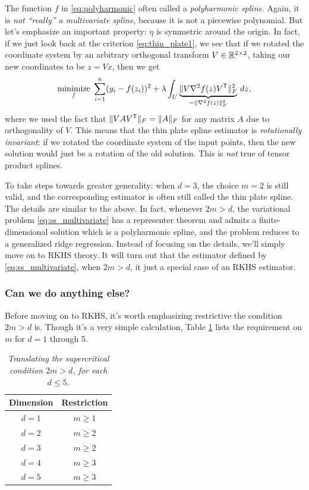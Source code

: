 \documentclass{article}
\begin{document}
The function $f$ in \eqref{eq:polyharmonic} often called a \emph{polyharmonic
  spline}. Again, it is \emph{not ``really'' a multivariate spline}, because it
is not a piecewise polynomial. But let's emphasize an important property: $\eta$
is symmetric around the origin. In fact, if we just look back at the criterion
\eqref{eq:thin_plate1}, we see that if we rotated the coordinate system by an
arbitrary orthogonal transform $V \in \mathbb{R}^{2 \times 2}$, taking our new
coordinates to be $z=Vx$, then we get 
\[
\mathop{\mathrm{minimize}}_f \; \sum_{i=1}^n (y_i - f(z_i))^2 + \lambda \int_U \underbrace{
\| V \nabla^2 f(z) V^{\mathsf{T}}\|_F^2}_{= \|\nabla^2 f(z)\|_F^2} \, dz,  
\]
where we used the fact that $\|V A V^{\mathsf{T}}\|_F = \|A\|_F$ for any matrix $A$ due to
orthogonality of $V$. This means that the thin plate spline estimator is
\emph{rotationally invariant}: if we rotated the coordinate system of the input
points, then the new solution would just be a rotation of the old solution. This
is \emph{not} true of tensor product splines. 

To take steps towards greater generality: when $d=3$, the choice $m=2$ is still
valid, and the corresponding estimator is often still called the thin plate
spline. The details are similar to the above. In fact, whenever $2m > d$, the
variational problem \eqref{eq:ss_multivariate} has a representer theorem and
admits a finite-dimensional solution which is a polyharmonic spline, and the
problem reduces to a generalized ridge regression. Instead of focusing on the
details, we'll simply move on to RKHS theory. It will turn out that the
estimator defined by \eqref{eq:ss_multivariate}, when $2m > d$, it just a
special case of an RKHS estimator.

\subsubsection{Can we do anything else?}

Before moving on to RKHS, it's worth emphasizing restrictive the condition  
$2m > d$ is. Though it's a very simple calculation, Table
\ref{tab:supercritical} lists the requirement on $m$ for $d=1$ through 5.  

\begin{table}[htb]
\centering
\begin{tabular}{c|c}
Dimension & Restriction \\
\hline
$d=1$ & $m \geq 1$ \\
$d=2$ & $m \geq 2$ \\
$d=3$ & $m \geq 2$ \\
$d=4$ & $m \geq 3$ \\
$d=5$ & $m \geq 3$ 
\end{tabular}
\caption{\it Translating the supercritical condition $2m > d$, for each $d 
  \leq 5$.} 
\label{tab:supercritical} 
\end{table}
\end{document}
